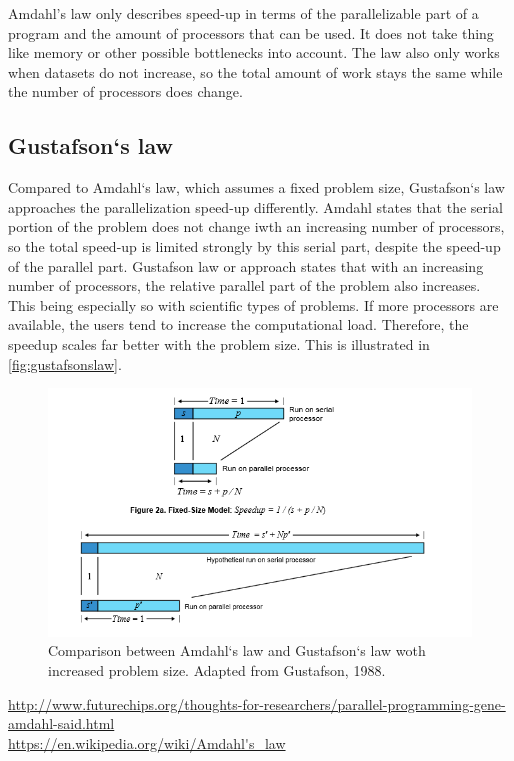 \documentclass[a4paper]{article}
\begin{document}
Amdahl's law only describes speed-up in terms of the parallelizable part of a program and the amount of processors that can be used. It does not take thing like memory or other possible bottlenecks into account. The law also only works when datasets do not increase, so the total amount of work stays the same while the number of processors does change.

\subsection{Gustafson`s law}
Compared to Amdahl`s law, which assumes a fixed problem size, Gustafson`s law approaches the parallelization speed-up differently. Amdahl states that the serial portion of the problem does not change iwth an increasing number of processors, so the total speed-up is limited strongly by this serial part, despite the speed-up of the parallel part.
Gustafson law or approach states that with an increasing number of processors, the relative parallel part of the problem also increases. This being especially so with scientific types of problems. If more processors are available, the users tend to increase the computational load. Therefore, the speedup scales far better with the problem size. This is illustrated in \autoref{fig:gustafsonslaw}.

\begin{figure}
\includegraphics[width=\textwidth]{Law}
\caption{Comparison between Amdahl`s law and Gustafson`s law woth increased problem size. Adapted from Gustafson, 1988.}
\label{fig:gustafsonslaw}
\end{figure}

\pagebreak
\nocite{*}



\url{http://www.futurechips.org/thoughts-for-researchers/parallel-programming-gene-amdahl-said.html} \\
\url{https://en.wikipedia.org/wiki/Amdahl's_law}
\end{document}
